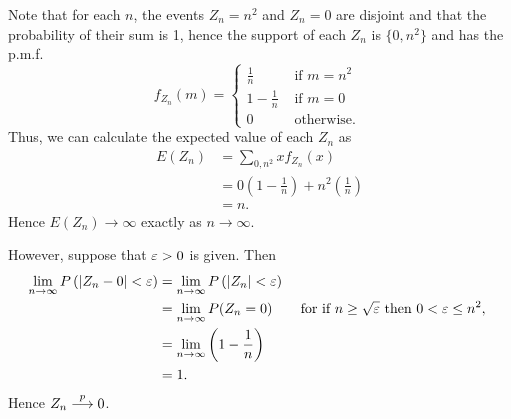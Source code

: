 \documentclass{stat_homework}
\begin{document}
\begin{solution}
  Note that for each $n$, the events $Z_n = n^2$ and $Z_n = 0$ are disjoint and that the probability of their sum is 1, hence the support of each $Z_n$ is $\{0,n^2\}$ and has the p.m.f. 
  $$
    f_{Z_n} ( m ) = 
  \begin{cases}
    \frac 1n &\text{ if } m = n^2\\
    1 - \frac 1n &\text{ if } m = 0\\
    0 &\text{ otherwise. }
  \end{cases}
  $$
  Thus, we can calculate the expected value of each $Z_n$ as
  \begin{align*}
    E(Z_n) &= \sum_{0,n^2} x f_{Z_n}(x) \\
    &= 0\left( 1 - \frac 1n\right) + n^2 \left( \frac 1n \right) \\
    &= n.
  \end{align*}
  Hence $E(Z_n) \to \infty$ exactly as $n \to \infty$.
  
  However, suppose that $\varepsilon > 0$ is given. Then
  \begin{align*}
    \lim_{n\to \infty} P\left( |Z_n - 0| < \varepsilon \right)
    &= \lim_{n\to \infty} P\left( |Z_n| < \varepsilon \right) \\
    &= \lim_{n\to \infty}P( Z_n = 0 ) &\text{ for if $n\ge\sqrt {\varepsilon}$ then $0 <\varepsilon \le n^2,$ } \\
    &= \lim_{n\to\infty} \left(1 - \frac 1n\right)\\
    &= 1.
  \end{align*}
  Hence $Z_n\stackrel{p}\longrightarrow0$.
\end{solution}
\newpage
\end{document}
